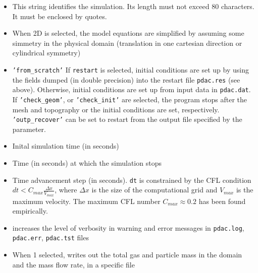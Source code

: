 \begin{itemize}
\item
{}
{This string identifies the simulation. Its length must not exceed 80 characters. It must be enclosed by quotes.}

\item
{}
{When 2D is selected, the model equations are simplified by assuming
some simmetry in the physical domain (translation in one cartesian 
direction or cylindrical symmetry)}

\item
{}
{{\tt 'from\_scratch'}}
{If {\tt restart} is selected, initial conditions are set up by using the fields
dumped (in double precision) into the restart file {\tt pdac.res} (see above). 
Otherwise, initial conditions are set up from input data in {\tt pdac.dat}.
If {\tt 'check\_geom'}, or {\tt 'check\_init'} are selected, the program stops
after the mesh and topography or the initial conditions are set, respectively.
{\tt 'outp\_recover'} can be set to restart from the output file specified
by the  parameter.} 

\item
{}
{Inital simulation time (in seconds)}

\item
{}
{Time (in seconds) at which the simulation stops}

\item
{}
{Time advancement step (in seconds). 
{\tt dt} is constrained by the CFL condition
$dt < C_{max}\frac{\Delta x}{V_{max}}$, where $\Delta x$ is
the size of the computational grid and $V_{max}$ is the maximum
velocity. The maximum CFL number $C_{max}\approx 0.2$ has been 
found empirically.}

\item
{}
{increases the level of verbosity in warning and error messages 
in {\tt pdac.log}, {\tt pdac.err}, {\tt pdac.tst} files}

\item
{}
{ When 1 selected, writes out the total gas and particle mass in the domain
and the mass flow rate, in a specific file }


\end{itemize}
